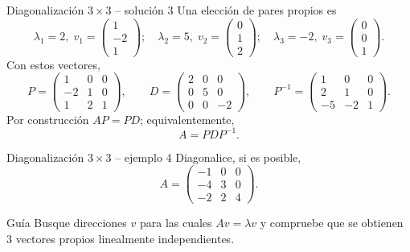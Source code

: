 \documentclass[aspectratio=169,10pt]{beamer}
\begin{document}
\begin{frame}{Diagonalización $3\times 3$ -- solución 3}
\scriptsize
Una elección de pares propios es
\[
\lambda_1=2,\;v_1=\begin{pmatrix}1\\-2\\1\end{pmatrix};\quad \lambda_2=5,\;v_2=\begin{pmatrix}0\\1\\2\end{pmatrix};\quad \lambda_3=-2,\;v_3=\begin{pmatrix}0\\0\\1\end{pmatrix}.
\]
Con estos vectores,
\[
P=\begin{pmatrix}1 & 0 & 0\\-2 & 1 & 0\\1 & 2 & 1\end{pmatrix},\qquad D=\begin{pmatrix}2 & 0 & 0\\0 & 5 & 0\\0 & 0 & -2\end{pmatrix},\qquad P^{-1}=\begin{pmatrix}1 & 0 & 0\\2 & 1 & 0\\-5 & -2 & 1\end{pmatrix}.
\]
Por construcción $AP=PD$; equivalentemente,
\[
\boxed{A=PDP^{-1}}.
\]
\end{frame}
\begin{frame}{Diagonalización $3\times 3$ -- ejemplo 4}
\small
Diagonalice, si es posible,
\[
A=\begin{pmatrix}-1 & 0 & 0\\-4 & 3 & 0\\-2 & 2 & 4\end{pmatrix}.
\]
\begin{block}{Guía}
Busque direcciones $v$ para las cuales $Av=\lambda v$ y compruebe que se obtienen $3$ vectores propios linealmente independientes.
\end{block}
\end{frame}
\end{document}
